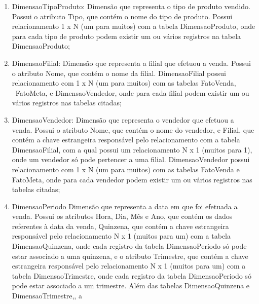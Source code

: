 \documentclass[a4paper]{article}
\begin{document}
\begin{enumerate}
{{do produto, e TipoProduto, que cont\'em a chave estrangeira respons\'avel pelo relacionamento N x 1 (muitos para um)
com a tabela DimensaoTipoProduto, onde cada produto s\'o pode ter um tipo. Al\'em da tabela DimensaoTipoProduto, a
tabela DimensaoProduto possui relacionamento com 1 x N (um para muitos) com as tabelas FatoVenda, FatoMeta e
FatoPrevisaoVendas, onde para cada produto podem existir um ou v\'arios registros nas tabelas Fato citadas;}}
\item {
\textsf{DimensaoTipoProduto: Dimens\~ao que representa o tipo de produto vendido. Possui o atributo Tipo, que cont\'em o
nome do tipo de produto. Possui relacionamento 1 x N (um para muitos) com a tabela DimensaoProduto, onde para cada tipo
de produto podem existir um ou v\'arios registros na tabela DimensaoProduto;}}
\item {
\textsf{DimensaoFilial: Dimens\~ao que representa a filial que efetuou a venda. Possui o atributo Nome, que cont\'em o
nome da filial. DimensaoFilial possui relacionamento com 1 x N (um para muitos) com as tabelas FatoVenda, \ FatoMeta, e
DimensaoVendedor, onde para cada filial podem existir um ou v\'arios registros nas tabelas citadas; }}
\item {
\textsf{DimensaoVendedor: Dimens\~ao que representa o vendedor que efetuou a venda. Possui o atributo Nome, que cont\'em
o nome do vendedor, e Filial, que cont\'em a chave estrangeira respons\'avel pelo relacionamento com a tabela
DimensaoFilial, com a qual possui um relacionamento N x 1 (muitos para 1), onde um vendedor s\'o pode pertencer a uma
filial. DimensaoVendedor possui relacionamento com 1 x N (um para muitos) com as tabelas FatoVenda e FatoMeta, onde
para cada vendedor podem existir um ou v\'arios registros nas tabelas citadas; \ }}
\item {
\textsf{DimensaoPeriodo Dimens\~ao que representa a data em que foi efetuada a venda. Possui os atributos Hora, Dia,
M\^es e Ano, que cont\'em os dados referentes \`a data da venda, Quinzena, que cont\'em a chave estrangeira
respons\'avel pelo relacionamento N x 1 (muitos para um) com a tabela DimensaoQuinzena, onde cada registro da tabela
DimensaoPeriodo s\'o pode estar associado a uma quinzena, e o atributo Trimestre, que cont\'em a chave estrangeira
respons\'avel pelo relacionamento N x 1 (muitos para um) com a tabela DimensaoTrimestre, onde cada registro da tabela
DimensaoPeriodo s\'o pode estar associado a um trimestre. Al\'em das tabelas DimensaoQuinzena e DimensaoTrimestre,, a
}}
\end{enumerate}
\end{document}
